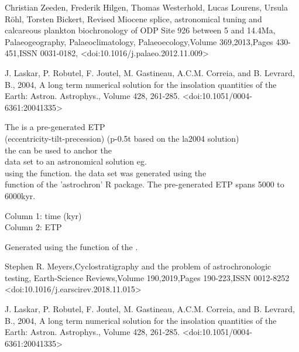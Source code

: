 \documentclass[a4paper]{book}
\begin{document}
%
\begin{References}
Christian Zeeden, Frederik Hilgen, Thomas Westerhold, Lucas Lourens, Ursula Röhl, Torsten Bickert,
Revised Miocene splice, astronomical tuning and calcareous plankton biochronology of ODP Site 926 between 5 and 14.4Ma,
Palaeogeography, Palaeoclimatology, Palaeoecology,Volume 369,2013,Pages 430-451,ISSN 0031-0182,
<doi:10.1016/j.palaeo.2012.11.009>

J. Laskar, P. Robutel, F. Joutel, M. Gastineau, A.C.M. Correia, and B. Levrard, B., 2004,
A long term numerical solution for the insolation quantities of the Earth: Astron. Astrophys.,
Volume 428, 261-285. <doi:10.1051/0004-6361:20041335>
\end{References}
%
\begin{Description}
The  is a pre-generated ETP \\{}
(eccentricity-tilt-precession) (p-0.5t based on the la2004 solution) \\{}
the  can be used to anchor the \\{}
data set to an astronomical solution eg.  \\{}
using the   function. the data set was generated using the \\{}
 function of the 'astrochron' R package.
The pre-generated ETP spans 5000 to 6000kyr.
\end{Description}
%
\begin{Details}
Column 1: time (kyr)\\{}
Column 2: ETP  \\{}
\end{Details}
%
\begin{Author}
Generated using the 
function of the .
\end{Author}
%
\begin{References}
Stephen R. Meyers,Cyclostratigraphy and the problem of astrochronologic testing,
Earth-Science Reviews,Volume 190,2019,Pages 190-223,ISSN 0012-8252
<doi:10.1016/j.earscirev.2018.11.015>

J. Laskar, P. Robutel, F. Joutel, M. Gastineau, A.C.M. Correia, and B. Levrard, B., 2004,
A long term numerical solution for the insolation quantities of the Earth: Astron. Astrophys.,
Volume 428, 261-285. <doi:10.1051/0004-6361:20041335>
\end{References}
\end{document}
